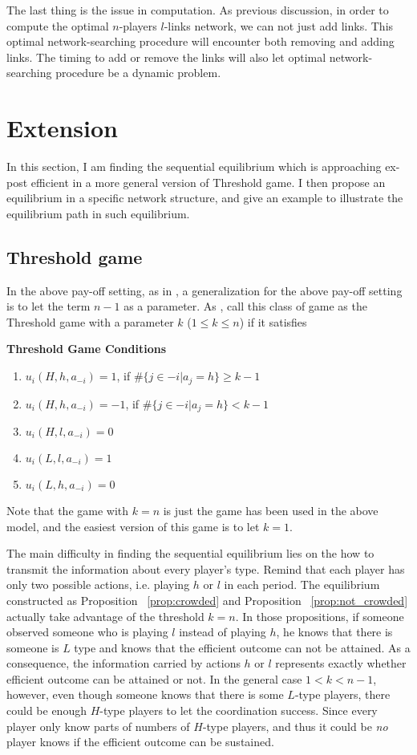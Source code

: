 \documentclass[12pt,letter]{article}
\theoremstyle{remark}
\theoremstyle{remark}
\theoremstyle{claim}
\begin{document}
The last thing is the issue in computation. As previous discussion, in order to compute the optimal $n$-players $l$-links network, we can not just add links. This optimal network-searching procedure will encounter both removing and adding links. The timing to add or remove the links will also let optimal network-searching procedure be a dynamic problem. 



\section{Extension}

In this section, I am finding the sequential equilibrium which is approaching ex-post efficient in a more general version of Threshold game. I then propose an equilibrium in a specific network structure, and give an example to illustrate the equilibrium path in such equilibrium.

\subsection{Threshold game}
\label{sec:thres}
In the above pay-off setting, as in \cite{chwe2000}, a generalization for the above pay-off setting is to let the term $n-1$ as a parameter. As \cite{chwe2000}, call this class of game as the Threshold game with a parameter $k$ ($1\leq k \leq n$) if it satisfies

\bigskip
\noindent \textbf{Threshold Game Conditions}
\begin{enumerate}
\item $u_i(H,h,a_{-i})=1$, if $\#\{j\in -i|a_j=h\}\geq k-1$
\item $u_i(H,h,a_{-i})=-1$, if $\#\{j\in -i|a_j=h\}<k-1$
\item $u_i(H,l,a_{-i})=0$
\item $u_i(L,l,a_{-i})=1$
\item $u_i(L,h,a_{-i})=0$
\end{enumerate}

Note that the game with $k=n$ is just the game has been used in the above model, and the easiest version of this game is to let $k=1$.

The main difficulty in finding the sequential equilibrium lies on the how to transmit the information about every player's type. Remind that each player has only two possible actions, i.e. playing $h$ or $l$ in each period. The equilibrium constructed as Proposition ~\ref{prop:crowded} and Proposition ~\ref{prop:not_crowded} actually take advantage of the threshold $k=n$. In those propositions, if someone observed someone who is playing $l$ instead of playing $h$, he knows that there is someone is $L$ type and knows that the efficient outcome can not be attained. As a consequence, the information carried by actions $h$ or $l$ represents exactly whether efficient outcome can be attained or not. In the general case $1<k<n-1$, however, even though someone knows that there is some $L$-type players, there could be enough $H$-type players to let the coordination success. Since every player only know parts of numbers of $H$-type players, and thus it could be \textit{no} player knows if the efficient outcome can be sustained. 
\end{document}
